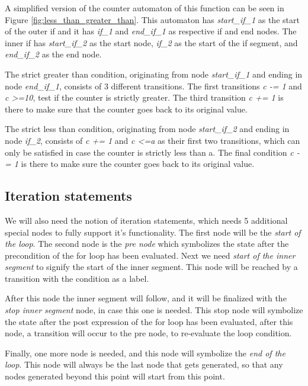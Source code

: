 \documentclass[12pt]{thesis}
\begin{document}
A simplified version of the counter automaton of this function can be seen in Figure \ref{fig:less_than_greater_than}. This automaton has \textit{start\_if\_1} as the start of the outer if and it has \textit{if\_1} and \textit{end\_if\_1} as respective if and end nodes. The inner if has \textit{start\_if\_2} as the start node, \textit{if\_2} as the start of the if segment, and \textit{end\_if\_2} as the end node.

The strict greater than condition, originating from node \textit{start\_if\_1} and ending in node \textit{end\_if\_1}, consists of 3 different transitions. The first transitions \textit{c -= 1} and \textit{c \textgreater =10}, test if the counter is strictly greater. The third transition \textit{c += 1} is there to make sure that the counter goes back to its original value.

The strict less than condition, originating from node \textit{start\_if\_2} and ending in node \textit{if\_2}, consists of \textit{c += 1} and \textit{c \textless =a} as their first two transitions, which can only be satisfied in case the counter is strictly less than a. The final condition \textit{c -= 1} is there to make sure the counter goes back to its original value.

\subsection{Iteration statements}
We will also need the notion of iteration statements, which needs 5 additional special nodes to fully support it's functionality. The first node will be the \textit{start of the loop}. The second node is the \textit{pre node} which symbolizes the state after the precondition of the for loop has been evaluated. Next we need \textit{start of the inner segment} to signify the start of the inner segment. This node will be reached by a transition with the condition as a label. 

After this node the inner segment will follow, and it will be finalized with the \textit{stop inner segment} node, in case this one is needed. This stop node will symbolize the state after the post expression of the for loop has been evaluated, after this node, a transition will occur to the pre node, to re-evaluate the loop condition.

Finally, one more node is needed, and this node will symbolize the \textit{end of the loop}. This node will always be the last node that gets generated, so that any nodes generated beyond this point will start from this point.
\end{document}

